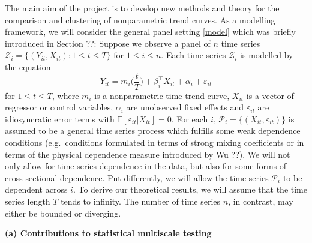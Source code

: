 \documentclass[a4paper,12pt]{article}
\begin{document}
\begin{itemize}[label=--,leftmargin=0.5cm]
The main aim of the project is to develop new methods and theory for the comparison and clustering of nonparametric trend curves. As a modelling framework, we will consider the general panel setting \eqref{model} which was briefly introduced in Section ??:  Suppose we observe a panel of $n$ time series $\mathcal{Z}_i = \{(Y_{it},X_{it}): 1 \le t \le T\}$ for $ 1 \le i \le n$. Each time series $\mathcal{Z}_i$ is modelled by the equation 
\begin{equation}\label{model-objectives}
Y_{it} = m_i \Big( \frac{t}{T} \Big) + \beta_i^\top X_{it} + \alpha_i + \varepsilon_{it} 
\end{equation}
for $ 1 \le t \le T$, where $m_i$ is a nonparametric time trend curve, $X_{it}$ is a vector of regressor or control variables, $\alpha_i$ are unobserved fixed effects and $\varepsilon_{it}$ are idiosyncratic error terms with $\mathbb{E}[\varepsilon_{it}|X_{it} ] = 0$. For each $i$, $\mathcal{P}_i = \{(X_{it},\varepsilon_{it})\}$ is assumed to be a general time series process which fulfills some weak dependence conditions (e.g.\ conditions formulated in terms of strong mixing coefficients or in terms of the physical dependence measure introduced by Wu ??). We will not only allow for time series dependence in the data, but also for some forms of cross-sectional dependence. Put differently, we will allow the time series $\mathcal{P}_i$ to be dependent across $i$. To derive our theoretical results, we will assume that the time series length $T$ tends to infinity. The number of time series $n$, in contrast, may either be bounded or diverging. 
\vspace{15pt}


\noindent \textbf{(a) Contributions to statistical multiscale testing} 
\vspace{10pt} 



\end{itemize}
\end{document}
